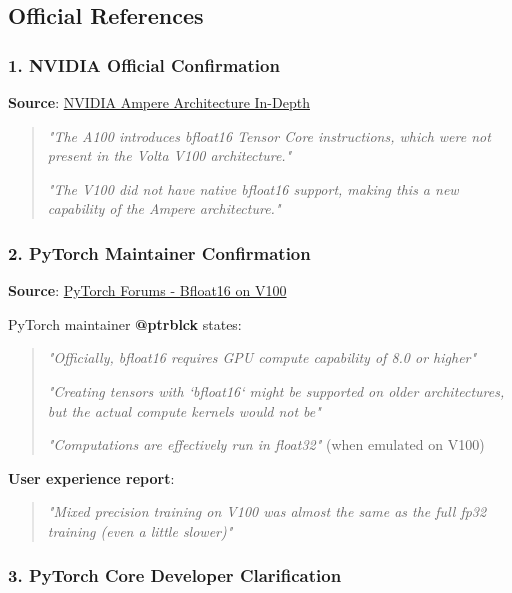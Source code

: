\documentclass[11pt,a4paper]{article}
\begin{document}
\subsection{Official References}

\subsubsection{1. NVIDIA Official Confirmation}

\textbf{Source}: \href{https://developer.nvidia.com/blog/nvidia-ampere-architecture-in-depth/}{NVIDIA Ampere Architecture In-Depth}

\begin{quote}
\textit{"The A100 introduces bfloat16 Tensor Core instructions, which were not present in the Volta V100 architecture."}

\textit{"The V100 did not have native bfloat16 support, making this a new capability of the Ampere architecture."}
\end{quote}

\subsubsection{2. PyTorch Maintainer Confirmation}

\textbf{Source}: \href{https://discuss.pytorch.org/t/bfloat16-on-nvidia-v100-gpu/201629}{PyTorch Forums - Bfloat16 on V100}

PyTorch maintainer \textbf{@ptrblck} states:

\begin{quote}
\textit{"Officially, bfloat16 requires GPU compute capability of 8.0 or higher"}

\textit{"Creating tensors with `bfloat16` might be supported on older architectures, but the actual compute kernels would not be"}

\textit{"Computations are effectively run in float32"} (when emulated on V100)
\end{quote}

\textbf{User experience report}:
\begin{quote}
\textit{"Mixed precision training on V100 was almost the same as the full fp32 training (even a little slower)"}
\end{quote}

\subsubsection{3. PyTorch Core Developer Clarification}
\end{document}
